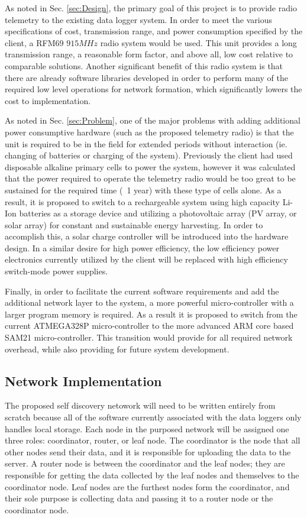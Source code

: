 \documentclass[12pt]{article}
\begin{document}
As noted in Sec. \ref{sec:Design}, the primary goal of this project is to provide radio telemetry to the existing data logger system. In order to meet the various specifications of cost, transmission range, and power consumption specified by the client, a RFM69 $915 MHz$ radio system would be used. This unit provides a long transmission range, a reasonable form factor, and above all, low cost relative to comparable solutions. %
Another significant benefit of this radio system is that there are already software libraries developed in order to perform many of the required low level operations for network formation, which significantly lowers the cost to implementation.

As noted in Sec. \ref{sec:Problem}, one of the major problems with adding additional power consumptive hardware (such as the proposed telemetry radio) is that the unit is required to be in the field for extended periods without interaction (ie. changing of batteries or charging of the system). Previously the client had used disposable alkaline primary cells to power the system, however it was calculated that the power required to operate the telemetry radio would be too great to be sustained for the required time (~1 year) with these type of cells alone. As a result, it is proposed to switch to a rechargeable system using high capacity Li-Ion batteries as a storage device and utilizing a photovoltaic array (PV array, or solar array) for constant and sustainable energy harvesting. In order to accomplish this, a solar charge controller will be introduced into the hardware design. In a similar desire for high power efficiency, the low efficiency power electronics currently utilized by the client will be replaced with high efficiency switch-mode power supplies.

Finally, in order to facilitate the current software requirements and add the additional network layer to the system, a more powerful micro-controller with a larger program memory is required. As a result it is proposed to switch from the current ATMEGA328P micro-controller to the more advanced ARM core based SAM21 micro-controller. This transition would provide for all required network overhead, while also providing for future system development.


\subsection{Network Implementation}
The proposed self discovery netowork will need to be written entirely from scratch because all of the software currently associated with the data loggers only handles local storage. Each node in the purposed network will be assigned one three roles: coordinator, router, or leaf node. The coordinator is the node that all other nodes send their data, and it is responsible for uploading the data to the server. A router node is between the coordinator and the leaf nodes; they are responsible for getting the data collected by the leaf nodes and themselves to the coordinator node. Leaf nodes are the furthest nodes form the coordinator, and their sole purpose is collecting data and passing it to a router node or the coordinator node.
\end{document}
